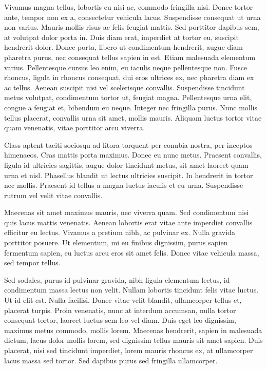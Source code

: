 Vivamus magna tellus, lobortis eu nisi ac, commodo fringilla nisi. Donec tortor ante, tempor non ex a, consectetur vehicula lacus. Suspendisse consequat ut urna non varius. Mauris mollis risus ac felis feugiat mattis. Sed porttitor dapibus sem, at volutpat dolor porta in. Duis diam erat, imperdiet at tortor eu, suscipit hendrerit dolor. Donec porta, libero ut condimentum hendrerit, augue diam pharetra purus, nec consequat tellus sapien in est. Etiam malesuada elementum varius. Pellentesque cursus leo enim, eu iaculis neque pellentesque non. Fusce rhoncus, ligula in rhoncus consequat, dui eros ultrices ex, nec pharetra diam ex ac tellus. Aenean suscipit nisi vel scelerisque convallis. Suspendisse tincidunt metus volutpat, condimentum tortor ut, feugiat magna. Pellentesque urna elit, congue a feugiat et, bibendum eu neque. Integer nec fringilla purus. Nunc mollis tellus placerat, convallis urna sit amet, mollis mauris. Aliquam luctus tortor vitae quam venenatis, vitae porttitor arcu viverra.

Class aptent taciti sociosqu ad litora torquent per conubia nostra, per inceptos himenaeos. Cras mattis porta maximus. Donec eu nunc metus. Praesent convallis, ligula id ultricies sagittis, augue dolor tincidunt metus, sit amet laoreet quam urna et nisl. Phasellus blandit ut lectus ultricies suscipit. In hendrerit in tortor nec mollis. Praesent id tellus a magna luctus iaculis et eu urna. Suspendisse rutrum vel velit vitae convallis.

Maecenas sit amet maximus mauris, nec viverra quam. Sed condimentum nisi quis lacus mattis venenatis. Aenean lobortis erat vitae ante imperdiet convallis efficitur eu lectus. Vivamus a pretium nibh, ac pulvinar ex. Nulla gravida porttitor posuere. Ut elementum, mi eu finibus dignissim, purus sapien fermentum sapien, eu luctus arcu eros sit amet felis. Donec vitae vehicula massa, sed tempor tellus.

Sed sodales, purus id pulvinar gravida, nibh ligula elementum lectus, id condimentum massa lectus non velit. Nullam lobortis tincidunt felis vitae luctus. Ut id elit est. Nulla facilisi. Donec vitae velit blandit, ullamcorper tellus et, placerat turpis. Proin venenatis, nunc at interdum accumsan, nulla tortor consequat tortor, laoreet luctus sem leo vel diam. Duis eget leo dignissim, maximus metus commodo, mollis lorem. Maecenas hendrerit, sapien in malesuada dictum, lacus dolor mollis lorem, sed dignissim tellus mauris sit amet sapien. Duis placerat, nisi sed tincidunt imperdiet, lorem mauris rhoncus ex, at ullamcorper lacus massa sed tortor. Sed dapibus purus sed fringilla ullamcorper.
